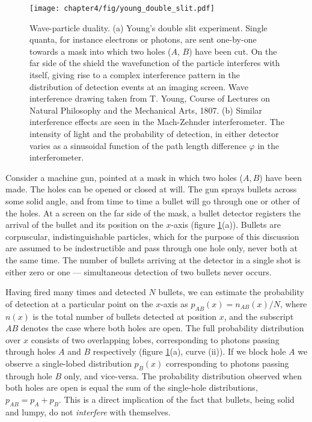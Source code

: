 \begin{figure}[t!]
\centering
\texttt{[image: chapter4/fig/young\_double\_slit.pdf]}
\caption[Young's double slit and the Mach-Zehnder interferometer]{Wave-particle duality. 
    (a) Young's double slit experiment. Single quanta, for instance electrons or photons, are sent one-by-one towards a mask into which two holes ($A$, $B$) have been cut. On the far side of the shield the wavefunction of the particle interferes with itself, giving rise to a complex interference pattern in the distribution of detection events at an imaging screen. 
Wave interference drawing taken from T. Young, Course of Lectures on Natural Philosophy and the Mechanical Arts, 1807.
(b) Similar interference effects are seen in the Mach-Zehnder interferometer. The intensity of light and the probability of detection, in either detector varies as a sinusoidal function of the path length difference $\varphi$ in the interferometer.}
\label{fig:young-double-slit}
\end{figure}

Consider a machine gun, pointed at a mask in which two holes ($A, B$) have been made. The holes can be opened or closed at will. The gun sprays bullets across some solid angle, and from time to time a bullet will go through one or other of the holes. At a screen on the far side of the mask, a bullet detector registers the arrival of the bullet and its position on the $x$-axis (figure \ref{fig:young-double-slit}(a)). Bullets are corpuscular, indistinguishable particles, which for the purpose of this discussion are assumed to be indestructible and pass through one hole only, never both at the same time. The number of bullets arriving at the detector in a single shot is either zero or one --- simultaneous detection of two bullets never occurs.

Having fired many times and detected $N$ bullets, we can estimate the probability of detection at a particular point on the $x$-axis as $p_{AB}(x) = n_{AB}(x) / N$, where $n(x)$ is the total number of bullets detected at position $x$, and the subscript $AB$ denotes the case where both holes are open. The full probability distribution over $x$ consists of two overlapping lobes, corresponding to photons passing through holes $A$ and $B$ respectively (figure \ref{fig:young-double-slit}(a), curve (ii)). If we block hole $A$ we observe a single-lobed distribution $p_B(x)$ corresponding to photons passing through hole $B$  only, and vice-versa. The probability distribution observed when both holes are open is equal the sum of the single-hole distributions, $p_{AB} = p_A+p_B$. This is a direct implication of the fact that bullets, being solid and lumpy, do not \emph{interfere} with themselves.


